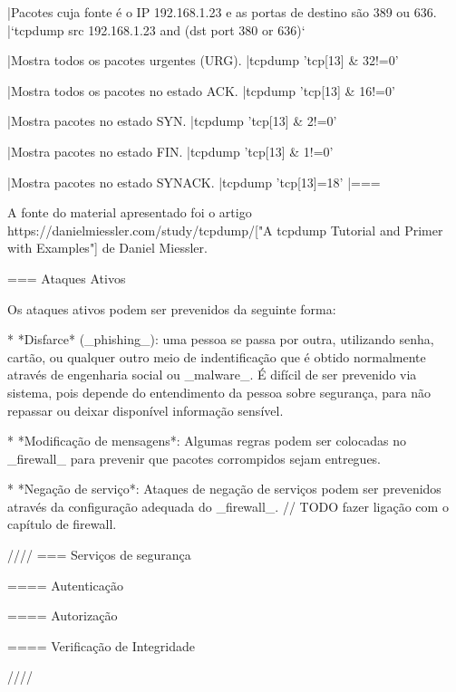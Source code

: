 |Pacotes cuja fonte é o IP 192.168.1.23 e as portas de destino são 389 ou 636.
|`tcpdump src 192.168.1.23 and (dst port 380 or 636)`

|Mostra  todos os pacotes urgentes (URG).
|tcpdump 'tcp[13] & 32!=0'

|Mostra  todos os pacotes no estado ACK.
|tcpdump 'tcp[13] & 16!=0'

|Mostra pacotes no estado SYN.
|tcpdump 'tcp[13] & 2!=0'

|Mostra pacotes no estado FIN.
|tcpdump 'tcp[13] & 1!=0'

|Mostra pacotes no estado SYNACK.
|tcpdump 'tcp[13]=18'
|===

A fonte do material apresentado foi o artigo
https://danielmiessler.com/study/tcpdump/["A tcpdump Tutorial and
Primer with Examples"] de Daniel Miessler.

=== Ataques Ativos

Os ataques ativos podem ser prevenidos da seguinte forma:

* *Disfarce* (_phishing_): uma pessoa se passa por outra, utilizando
senha, cartão, ou qualquer outro meio de indentificação que é obtido
normalmente através de engenharia social ou _malware_. É difícil de
ser prevenido via sistema, pois depende do entendimento da pessoa
sobre segurança, para não repassar ou deixar disponível informação
sensível.

* *Modificação de mensagens*: Algumas regras podem ser colocadas no
_firewall_ para prevenir que pacotes corrompidos sejam entregues.

* *Negação de serviço*: Ataques de negação de serviços podem ser
prevenidos através da configuração adequada do _firewall_.
// TODO fazer ligação com o capítulo de firewall.

////
=== Serviços de segurança

==== Autenticação

==== Autorização

==== Verificação de Integridade

////
